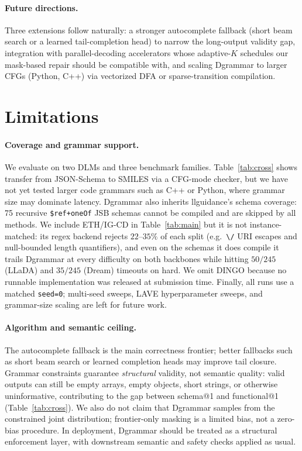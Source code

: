 \documentclass[11pt]{article}
\begin{document}
\paragraph{Future directions.} Three extensions follow naturally: a stronger autocomplete fallback (short beam search or a learned tail-completion head) to narrow the long-output validity gap, integration with parallel-decoding accelerators \citep{fastdllm2025,dmax2025,chen2025dparallel} whose adaptive-$K$ schedules our mask-based repair should be compatible with, and scaling Dgrammar to larger CFGs (Python, C++) via vectorized DFA or sparse-transition compilation.

\section*{Limitations}

\paragraph{Coverage and grammar support.} We evaluate on two DLMs and three benchmark families. Table~\ref{tab:cross} shows transfer from JSON-Schema to SMILES via a CFG-mode checker, but we have not yet tested larger code grammars such as C++ or Python, where grammar size may dominate latency. Dgrammar also inherits llguidance's schema coverage: 75 recursive \texttt{\$ref+oneOf} JSB schemas cannot be compiled and are skipped by all methods. We include ETH/IG-CD \citep{mundler2025} in Table~\ref{tab:main} but it is not instance-matched: its regex backend rejects $22$--$35\%$ of each split (e.g.\ \texttt{\textbackslash/} URI escapes and null-bounded length quantifiers), and even on the schemas it does compile it trails Dgrammar at every difficulty on both backbones while hitting $50/245$ (LLaDA) and $35/245$ (Dream) timeouts on hard. We omit DINGO \citep{dingo2025} because no runnable implementation was released at submission time. Finally, all runs use a matched \texttt{seed=0}; multi-seed sweeps, LAVE hyperparameter sweeps, and grammar-size scaling are left for future work.

\paragraph{Algorithm and semantic ceiling.} The autocomplete fallback is the main correctness frontier; better fallbacks such as short beam search or learned completion heads may improve tail closure. Grammar constraints guarantee \emph{structural} validity, not semantic quality: valid outputs can still be empty arrays, empty objects, short strings, or otherwise uninformative, contributing to the gap between schema@1 and functional@1 (Table~\ref{tab:cross}). We also do not claim that Dgrammar samples from the constrained joint distribution; frontier-only masking is a limited bias, not a zero-bias procedure. In deployment, Dgrammar should be treated as a structural enforcement layer, with downstream semantic and safety checks applied as usual.
\end{document}
